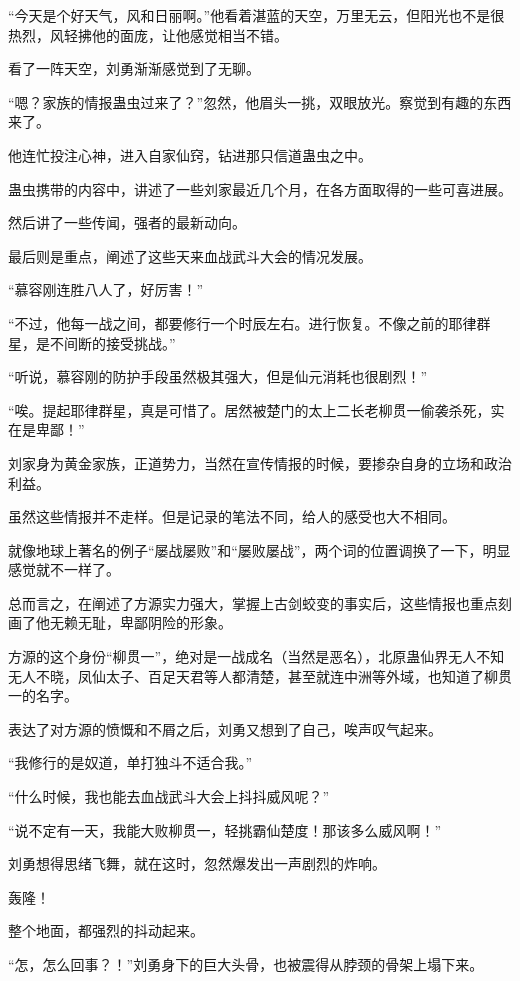 \begin{this_body}
“今天是个好天气，风和日丽啊。”他看着湛蓝的天空，万里无云，但阳光也不是很热烈，风轻拂他的面庞，让他感觉相当不错。

看了一阵天空，刘勇渐渐感觉到了无聊。

“嗯？家族的情报蛊虫过来了？”忽然，他眉头一挑，双眼放光。察觉到有趣的东西来了。

他连忙投注心神，进入自家仙窍，钻进那只信道蛊虫之中。

蛊虫携带的内容中，讲述了一些刘家最近几个月，在各方面取得的一些可喜进展。

然后讲了一些传闻，强者的最新动向。

最后则是重点，阐述了这些天来血战武斗大会的情况发展。

“慕容刚连胜八人了，好厉害！”

“不过，他每一战之间，都要修行一个时辰左右。进行恢复。不像之前的耶律群星，是不间断的接受挑战。”

“听说，慕容刚的防护手段虽然极其强大，但是仙元消耗也很剧烈！”

“唉。提起耶律群星，真是可惜了。居然被楚门的太上二长老柳贯一偷袭杀死，实在是卑鄙！”

刘家身为黄金家族，正道势力，当然在宣传情报的时候，要掺杂自身的立场和政治利益。

虽然这些情报并不走样。但是记录的笔法不同，给人的感受也大不相同。

就像地球上著名的例子“屡战屡败”和“屡败屡战”，两个词的位置调换了一下，明显感觉就不一样了。

总而言之，在阐述了方源实力强大，掌握上古剑蛟变的事实后，这些情报也重点刻画了他无赖无耻，卑鄙阴险的形象。

方源的这个身份“柳贯一”，绝对是一战成名（当然是恶名），北原蛊仙界无人不知无人不晓，凤仙太子、百足天君等人都清楚，甚至就连中洲等外域，也知道了柳贯一的名字。

表达了对方源的愤慨和不屑之后，刘勇又想到了自己，唉声叹气起来。

“我修行的是奴道，单打独斗不适合我。”

“什么时候，我也能去血战武斗大会上抖抖威风呢？”

“说不定有一天，我能大败柳贯一，轻挑霸仙楚度！那该多么威风啊！”

刘勇想得思绪飞舞，就在这时，忽然爆发出一声剧烈的炸响。

轰隆！

整个地面，都强烈的抖动起来。

“怎，怎么回事？！”刘勇身下的巨大头骨，也被震得从脖颈的骨架上塌下来。


\end{this_body}
